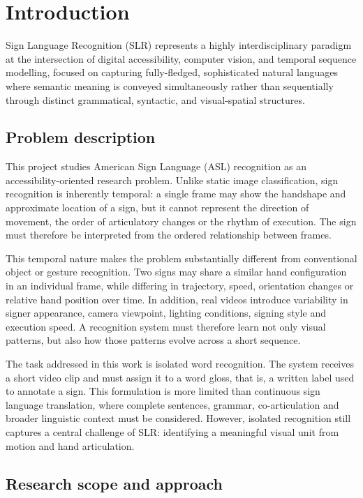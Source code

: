 \chapter{Introduction}
\setcounter{section}{0}

Sign Language Recognition (SLR) represents a highly interdisciplinary paradigm at the intersection
of digital accessibility, computer vision, and temporal sequence modelling, focused on capturing
fully-fledged, sophisticated natural languages where semantic meaning is conveyed simultaneously
rather than sequentially through distinct grammatical, syntactic, and visual-spatial structures.

\section{Problem description}

This project studies American Sign Language (ASL) recognition as an accessibility-oriented research
problem. Unlike static image classification, sign recognition is inherently temporal: a single
frame may show the handshape and approximate location of a sign, but it cannot represent the
direction of movement, the order of articulatory changes or the rhythm of execution. The sign must
therefore be interpreted from the ordered relationship between frames.

This temporal nature makes the problem substantially different from conventional object or gesture
recognition. Two signs may share a similar hand configuration in an individual frame, while
differing in trajectory, speed, orientation changes or relative hand position over time. In
addition, real videos introduce variability in signer appearance, camera viewpoint, lighting
conditions, signing style and execution speed. A recognition system must therefore learn not only
visual patterns, but also how those patterns evolve across a short sequence.

The task addressed in this work is isolated word recognition. The system receives a short video
clip and must assign it to a word gloss, that is, a written label used to annotate a sign. This
formulation is more limited than continuous sign language translation, where complete sentences,
grammar, co-articulation and broader linguistic context must be considered. However, isolated
recognition still captures a central challenge of SLR: identifying a meaningful visual unit from
motion and hand articulation.

\section{Research scope and approach}

